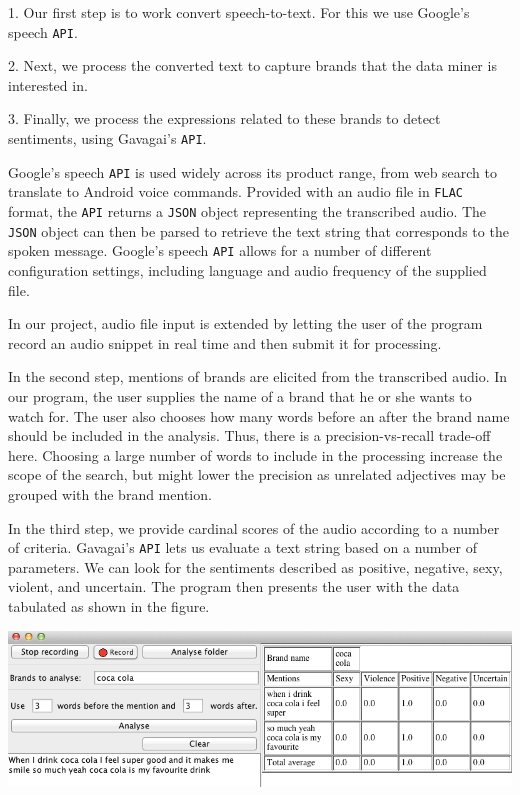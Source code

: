 \documentclass[a4paper,12pt,twoside]{ltxdoc}
\begin{document}
1. Our first step is to work convert speech-to-text. For this we use Google's speech \verb#API#.

2. Next, we process the converted text to capture brands that the data miner is interested in.

3. Finally, we process the expressions related to these brands to detect sentiments, using Gavagai's \verb#API#.

Google's speech \verb#API# is used widely across its product range, from web search to translate to Android voice commands.
Provided with an audio file in \verb#FLAC# format, the \verb#API# returns a \verb#JSON# object representing the transcribed audio. The \verb#JSON# object
can then be parsed to retrieve the text string that corresponds to the spoken message. Google's speech \verb#API# allows for a number
of different configuration settings, including language and audio frequency of the supplied file.

In our project, audio file input is extended by letting the user of the program record an audio snippet in real time and
then submit it for processing.

In the second step, mentions of brands are elicited from the transcribed audio. In our program, the user supplies the name
of a brand that he or she wants to watch for. The user also chooses how many words before an after the brand name should
be included in the analysis. Thus, there is a precision-vs-recall trade-off here. Choosing a large number of words to include
in the processing increase the scope of the search, but might lower the precision as unrelated adjectives may be grouped
with the brand mention.

In the third step, we provide cardinal scores of the audio according to a number of criteria. Gavagai's \verb#API# lets us
evaluate a text string based on a number of parameters. We can look for the sentiments described as positive, negative, sexy, violent,
and uncertain. The program then presents the user with the data tabulated as shown in the figure. %

\begin{center}
\includegraphics[scale=0.6]{../poster/screenshot_crop.png}
\end{center}
\end{document}
